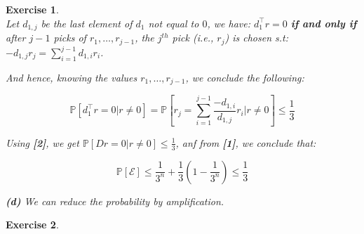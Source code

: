 \documentclass{article}
\newtheorem{exo}{Exercise}
\def\P{\mathbb{P}}
\begin{document}
\begin{exo}{\ \\}
Let $d_{1,j}$ be the last element of $d_1$ not equal to $0$, we have: $d_1^\top r=0$ \textbf{if and only if} after $j-1$ picks of $r_1, \dots , r_{j-1}$, the $j^{th}$ pick (i.e., $r_j$) is chosen s.t:   $-d_{1,j} r_j = \sum^{j-1}_{i=1} d_{1,i} r_i $.

And hence, knowing the values $r_1, \dots, r_{j-1}$, we conclude the following:


\[
\P[d_1^\top r = 0 | r\neq0]
= \P\left[r_j = \sum^{j-1}_{i=1} \frac{-d_{1,i}}{d_{1,j}} r_i |r\neq0\right] \leq \frac{1}{3} 
\]

Using \textbf{[2]}, we get $\P[D r = 0 | r\neq0] \leq \frac{1}{3}$, anf from \textbf{[1]}, we conclude that:

\[
\P[\mathcal{E}] \leq \frac{1}{3^n} + \frac{1}{3}(1- \frac{1}{3^n} ) \leq \frac{1}{3} 
\]

\noindent
\textbf{(d)} We can reduce the probability by amplification.

\end{exo}



\begin{exo}{\ \\}
    
    
\end{exo}
\end{document}
